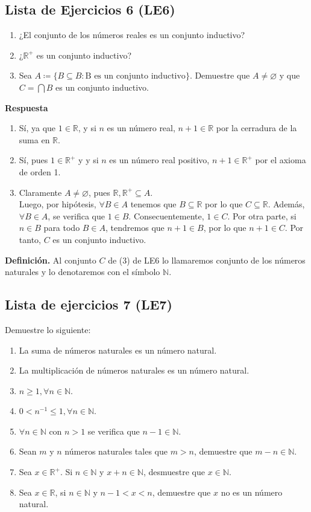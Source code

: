 \documentclass[11pt]{article}
\newcommand{\N}{\mathbb{N}}
\newcommand{\R}{\mathbb{R}}
\let\emptyset\varnothing
\begin{document}
\subsection*{Lista de Ejercicios 6 (LE6)}

\begin{enumerate}[label=\arabic*)]
    \item ¿El conjunto de los números reales es un conjunto inductivo?
    \item ¿$\R^+$ es un conjunto inductivo?
    \item Sea $A\coloneqq \{B \subseteq B: \text{B es un conjunto inductivo}\}$. Demuestre que $A\neq \emptyset$ y que $C=\bigcap B$ es un conjunto inductivo.
\end{enumerate}

\textbf{Respuesta}

\begin{enumerate}[label=\arabic*)]
    \item Sí, ya que $1 \in \R$, y si $n$ es un número real, $n+1 \in \R$ por la cerradura de la suma en $\R$.
    \item Sí, pues $1\in \R^+$ y y si $n$ es un número real positivo, $n+1 \in \R^+$ por el axioma de orden 1.
    \item Claramente $A \neq \emptyset$, pues $\R, \R^+ \subseteq A$. \\[5pt]Luego, por hipótesis, $\forall B \in A$ tenemos que $B\subseteq \R $ por lo que $C\subseteq \R$. Además, $\forall B\in A$, se verifica que $1\in B$. Consecuentemente, $1\in C$. Por otra parte, si $n\in B$ para todo $B\in A$, tendremos que $n+1\in B$, por lo que $n+1 \in C$. Por tanto, $C$ es un conjunto inductivo.
\end{enumerate}

\textbf{Definición.} Al conjunto $C$ de (3) de LE6 lo llamaremos conjunto de los números naturales y lo denotaremos con el símbolo $\N$.

\subsection*{Lista de ejercicios 7 (LE7)}

Demuestre lo siguiente:

\begin{enumerate}[label=\alph*)]
    \item La suma de números naturales es un número natural.
    \item La multiplicación de números naturales es un número natural.
    \item $n\geq 1, \forall n\in \N$.
    \item $0<n^{-1}\leq 1, \forall n\in \N$.
    \item $\forall n\in \N$ con $n>1$ se verifica que $n-1\in \N$.
    \item Sean $m$ y $n$ números naturales tales que $m>n$, demuestre que $m-n\in\N$.
    \item Sea $x\in \R^+$. Si $n\in \N$ y $x+n\in \N$, desmuestre que $x\in \N$.
    \item Sea $x\in \R$, si $n\in \N$ y $n-1<x<n$, demuestre que $x$ no es un número natural.
\end{enumerate}
\end{document}
